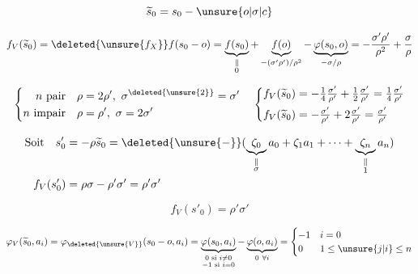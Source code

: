 
\[
\widetilde{s}_0=s_0-\unsure{o|\sigma|c}
\]

\deleted{\[
\begin{aligned}
s'_0&=\rho\widetilde{s}_0,\\
f_V(s'_0)&
\end{aligned}
\]}

\[
f_V(\widetilde{s}_0)=\deleted{\unsure{f_{X}}}f(s_0-o)=
 \underbrace{f(s_0)}_{\substack{\Vert\\0}}+\underbrace{f(o)}_{-(\sigma'\rho')/\rho^2}-
 \underbrace{\varphi(s_0,o)}_{-\sigma/\rho}
=-\frac{\sigma'\rho'}{\rho^2}+\frac{\sigma}{\rho}
\]

\[
\left\{\begin{aligned}
n\text{ pair}\quad&\rho=2\rho',\ \sigma^{\deleted{\unsure{2}}}=\sigma'\\
n\text{ impair}\quad&\rho=\rho',\ \sigma=2\sigma'
\end{aligned}\right.\quad
\left\{\begin{aligned}
f_V(\widetilde{s}_0)&=-\tfrac14\tfrac{\sigma'}{\rho'}+\tfrac12\tfrac{\sigma'}{\rho'}=\tfrac14\tfrac{\sigma'}{\rho'}\\
f_V(\widetilde{s}_0)&=-\tfrac{\sigma'}{\rho'}+2\tfrac{\sigma'}{\rho'}=\tfrac{\sigma'}{\rho'}
\end{aligned}\right.
\]

\[
\begin{aligned}
\text{Soit}\quad s'_0&=-\rho\widetilde{s}_0=\deleted{\unsure{-}}
(\underbrace{\zeta_0}_{\substack{\Vert\\\sigma}}a_0+\zeta_1a_1+\cdots+\underbrace{\zeta_n}_{\substack{\Vert\\1}}a_n)\\
f_V(s'_0)&=\rho\sigma-\rho'\sigma'=\rho'\sigma'
\end{aligned}
\]

\[
\boxed{f_V(s'_0)=\rho'\sigma'}
\]

\[
\varphi_V(\widetilde{s}_0,a_i)=\varphi_{\deleted{\unsure{V}}}(s_0-o,a_i)=
\underbrace{\varphi(s_0,a_i)}_{\substack{0\text{ si }i\ne0\\-1\text{ si }i=0}}
-\underbrace{\varphi(o,a_i)}_{0\ \forall i}
=\begin{cases}-1&i=0\\0&1\le\unsure{j|i}\le n\end{cases}
\]

